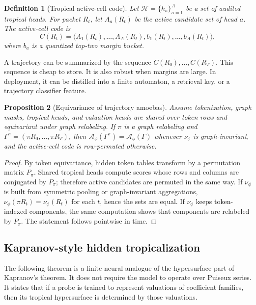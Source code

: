 \documentclass[11pt]{article}
\newtheorem{definition}{Definition}[section]
\newtheorem{proposition}[definition]{Proposition}
\newcommand{\calA}{\mathcal{A}}
\newcommand{\calH}{\mathcal{H}}
\begin{document}
\begin{definition}[Tropical active-cell code]
Let \(\calH=\{h_a\}_{a=1}^A\) be a set of audited tropical heads.  For packet \(R_t\), let \(A_a(R_t)\) be the active candidate set of head \(a\).  The active-cell code is
\begin{equation}
C(R_t)=\big(A_1(R_t),\ldots,A_A(R_t),b_1(R_t),\ldots,b_A(R_t)\big),
\end{equation}
where \(b_a\) is a quantized top-two margin bucket.
\end{definition}

A trajectory can be summarized by the sequence \(C(R_0),\ldots,C(R_T)\).  This sequence is cheap to store.  It is also robust when margins are large.  In deployment, it can be distilled into a finite automaton, a retrieval key, or a trajectory classifier feature.

\begin{proposition}[Equivariance of trajectory amoebas]
Assume tokenization, graph masks, tropical heads, and valuation heads are shared over token rows and equivariant under graph relabeling.  If \(\pi\) is a graph relabeling and \(\Gamma^\pi=(\pi R_0,\ldots,\pi R_T)\), then \(\calA_\phi(\Gamma^\pi)=\calA_\phi(\Gamma)\) whenever \(\nu_\phi\) is graph-invariant, and the active-cell code is row-permuted otherwise.
\end{proposition}

\begin{proof}
By token equivariance, hidden token tables transform by a permutation matrix \(P_\pi\).  Shared tropical heads compute scores whose rows and columns are conjugated by \(P_\pi\); therefore active candidates are permuted in the same way.  If \(\nu_\phi\) is built from symmetric pooling or graph-invariant aggregations, \(\nu_\phi(\pi R_t)=\nu_\phi(R_t)\) for each \(t\), hence the sets are equal.  If \(\nu_\phi\) keeps token-indexed components, the same computation shows that components are relabeled by \(P_\pi\).  The statement follows pointwise in time.
\end{proof}

\subsection{Kapranov-style hidden tropicalization}

The following theorem is a finite neural analogue of the hypersurface part of Kapranov's theorem.  It does not require the model to operate over Puiseux series.  It states that if a probe is trained to represent valuations of coefficient families, then its tropical hypersurface is determined by those valuations.
\end{document}
